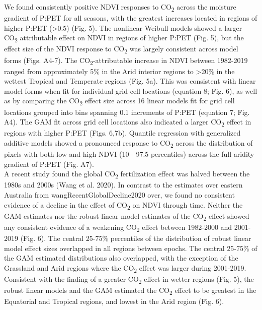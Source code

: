 \documentclass[
]{article}
\begin{document}
We found consistently positive NDVI responses to CO\textsubscript{2}
across the moisture gradient of P:PET for all seasons, with the greatest
increases located in regions of higher P:PET (\textgreater0.5) (Fig. 5).
The nonlinear Weibull models showed a larger CO\textsubscript{2}
attributable effect on NDVI in regions of higher P:PET (Fig. 5), but the
effect size of the NDVI response to CO\textsubscript{2} was largely
consistent across model forms (Figs. A4-7). The
CO\textsubscript{2}-attributable increase in NDVI between 1982-2019
ranged from approximately 5\% in the Arid interior regions to
\textgreater20\% in the wettest Tropical and Temperate regions (Fig.
5a). This was consistent with linear model forms when fit for individual
grid cell locations (equation 8; Fig. 6), as well as by comparing the
CO\textsubscript{2} effect size across 16 linear models fit for grid
cell locations grouped into bins spanning 0.1 increments of P:PET
(equation 7; Fig. A4). The GAM fit across grid cell locations also
indicated a larger CO\textsubscript{2} effect in regions with higher
P:PET (Figs. 6,7b). Quantile regression with generalized additive models
showed a pronounced response to CO\textsubscript{2} across the
distribution of pixels with both low and high NDVI (10 - 97.5
percentiles) across the full aridity gradient of P:PET (Fig. A7).\\
A recent study found the global CO\textsubscript{2} fertilization effect
was halved between the 1980s and 2000s (Wang et al. 2020). In contrast
to the estimates over eastern Australia from wangRecentGlobalDecline2020
over, we found no consistent evidence of a decline in the effect of
CO\textsubscript{2} on NDVI through time. Neither the GAM estimates nor
the robust linear model estimates of the CO\textsubscript{2} effect
showed any consistent evidence of a weakening CO\textsubscript{2} effect
between 1982-2000 and 2001-2019 (Fig. 6). The central 25-75\%
percentiles of the distribution of robust linear model effect sizes
overlapped in all regions between epochs. The central 25-75\% of the GAM
estimated distributions also overlapped, with the exception of the
Grassland and Arid regions where the CO\textsubscript{2} effect was
larger during 2001-2019. Consistent with the finding of a greater
CO\textsubscript{2} effect in wetter regions (Fig. 5), the robust linear
models and the GAM estimated the CO\textsubscript{2} effect to be
greatest in the Equatorial and Tropical regions, and lowest in the Arid
region (Fig. 6).\\
\clearpage
\end{document}

